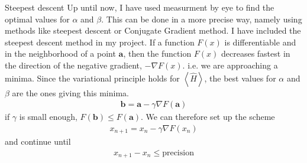 \documentclass[a4paper, 12pt, titlepage]{article}
\begin{document}
\begin{section}{Steepest descent}
 Up until now, I have used measurment by eye to find the optimal values for $\alpha$ and $\beta$. This can be done in a more precise way, namely using methods like steepest descent or Conjugate Gradient method. I have included the steepest descent method in my project.
 If a function $F(x)$ is differentiable and in the neighborhood of a point $\mathbf{a}$, then the function $F(x)$ decreases fastest in the direction of the negative gradient, $-\nabla F(x)$. i.e. we are approaching a minima. Since the variational principle holds for $\left<\hat H\right> $, the best values for $\alpha$ and $\beta$ are the ones giving this minima. 
 \begin{align*}
 	\mathbf{b} = \mathbf{a} - \gamma \nabla F(\mathbf{a}) 
 \end{align*}
 if $\gamma$ is small enough, $F(\mathbf{b}) \leq F(\mathbf{a})$. We can therefore set up the scheme
 \begin{align*}
 	x_{n+1} = x_n - \gamma \nabla F(x_n)
 \end{align*}
 and continue until
 \begin{align*}
 	x_{n+1} - x_n \leq \text{precision}
 \end{align*}

\end{section}
\end{document}
